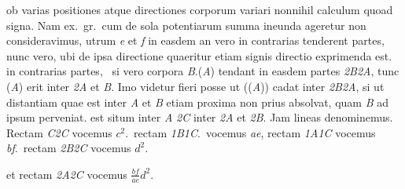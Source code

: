%
ob varias positiones
atque directiones\protect{} corporum variari nonnihil calculum quoad signa.\protect{}
%
Nam ex.~gr.\ cum de sola
potentiarum summa\protect{} ineunda ageretur non consideravimus, utrum
%
% 
\textit{e} et \textit{f} in easdem an vero
in contrarias tenderent partes, nunc vero, ubi de ipsa directione\protect{} quaeritur etiam signis\protect{} directio\protect{}
exprimenda est.%
\pend
%
\pstart 
%
% 
in contrarias partes\lbrack,\rbrack\ 
si vero corpora \textit{B}.(\textit{A}) tendant in easdem partes \textit{{\scriptsize2}B{\scriptsize2}A}, tunc (\textit{A}) erit inter \textit{{\scriptsize2}A} et \textit{B}. Imo videtur
fieri posse ut ((\textit{A})) cadat inter \textit{{\scriptsize2}B{\scriptsize2}A}, si
%
ut distantiam quae est inter \textit{A} et \textit{B}
etiam proxima non prius absolvat, quam \textit{B} ad ipsum perveniat.
%
est situm inter \textit{A}
% 
\textit{{\scriptsize2}C} inter \textit{{\scriptsize2}A} et \textit{{\scriptsize2}B}.
Jam lineas
%
denominemus. Rectam \textit{C{\scriptsize2}C}
 vocemus $c^2$.\ rectam \textit{{\scriptsize1}B{\scriptsize1}C}.\ vocemus \textit{ae}, rectam
%
\textit{{\scriptsize1}A{\scriptsize1}C} vocemus \textit{bf}.\ rectam \textit{{\scriptsize2}B{\scriptsize2}C} vocemus $d^2$.\ 
%
\rule[0cm]{0mm}{18pt}%
et rectam \textit{{\scriptsize2}A{\scriptsize2}C} vocemus $\displaystyle\frac{bf}{ae}d^2$. 
